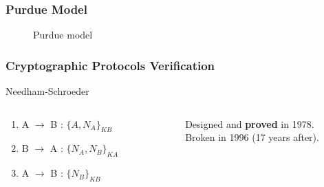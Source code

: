 \documentclass{beamer}
\begin{document}
\begin{frame}
    \frametitle{Purdue Model}

    \begin{figure}[htb]
        \resizebox{.8\columnwidth}{!}{
            
        }

        \caption{Purdue model \cite{Wil91}}
    \end{figure}
\end{frame}

\begin{frame}
    \frametitle{Cryptographic Protocols Verification}

    \begin{exampleblock}{Needham-Schroeder}
        \vspace{-.8em}
        \begin{columns}
            \begin{column}{.45\textwidth}
            \begin{enumerate}
                \item A $\rightarrow$ B : $\{A,N_{A}\}_{KB}$
                \item B $\rightarrow$ A : $\{N_{A},N_{B}\}_{KA}$
                \item A $\rightarrow$ B : $\{N_{B}\}_{KB}$
            \end{enumerate}
            \end{column}
            ~
            \begin{column}{.45\textwidth}
                Designed and {\bf proved} in 1978.\\%
                Broken in 1996 (17 years after).\\%
            \end{column}
        \end{columns}
    \end{exampleblock}


\end{frame}
\end{document}
